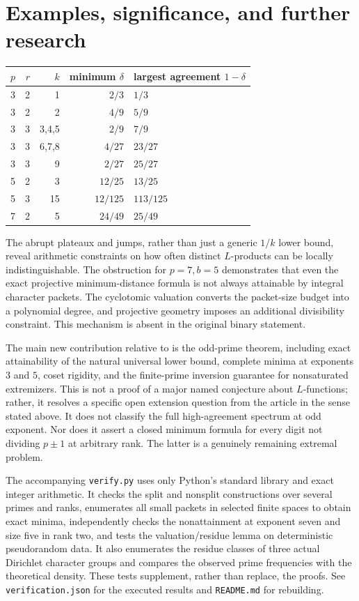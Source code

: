 \documentclass[11pt]{article}
\theoremstyle{remark}\newtheorem{remark}[theorem]{Remark}
\begin{document}
\section{Examples, significance, and further research}
\begin{center}
\small
\begin{tabular}{rrrrl}
\toprule
$p$&$r$&$k$& minimum $\delta$ & largest agreement $1-\delta$\\
\midrule
3&2&1&$2/3$&$1/3$\\
3&2&2&$4/9$&$5/9$\\
3&3&3,4,5&$2/9$&$7/9$\\
3&3&6,7,8&$4/27$&$23/27$\\
3&3&9&$2/27$&$25/27$\\
5&2&3&$12/25$&$13/25$\\
5&3&15&$12/125$&$113/125$\\
7&2&5&$24/49$&$25/49$\\
\bottomrule
\end{tabular}
\end{center}
The abrupt plateaux and jumps, rather than just a generic $1/k$ lower bound, reveal arithmetic constraints on how often distinct $L$-products can be locally indistinguishable. The obstruction for $p=7,b=5$ demonstrates that even the exact projective minimum-distance formula is not always attainable by integral character packets. The cyclotomic valuation converts the packet-size budget into a polynomial degree, and projective geometry imposes an additional divisibility constraint. This mechanism is absent in the original binary statement.

The main new contribution relative to \cite{article} is the odd-prime theorem, including exact attainability of the natural universal lower bound, complete minima at exponents $3$ and $5$, coset rigidity, and the finite-prime inversion guarantee for nonsaturated extremizers. This is not a proof of a major named conjecture about $L$-functions; rather, it resolves a specific open extension question from the article in the sense stated above. It does not classify the full high-agreement spectrum at odd exponent. Nor does it assert a closed minimum formula for every digit not dividing $p\pm1$ at arbitrary rank. The latter is a genuinely remaining extremal problem.

The accompanying \texttt{verify.py} uses only Python's standard library and exact integer arithmetic. It checks the split and nonsplit constructions over several primes and ranks, enumerates all small packets in selected finite spaces to obtain exact minima, independently checks the nonattainment at exponent seven and size five in rank two, and tests the valuation/residue lemma on deterministic pseudorandom data. It also enumerates the residue classes of three actual Dirichlet character groups and compares the observed prime frequencies with the theoretical density. These tests supplement, rather than replace, the proofs. See \texttt{verification.json} for the executed results and \texttt{README.md} for rebuilding.
\end{document}
